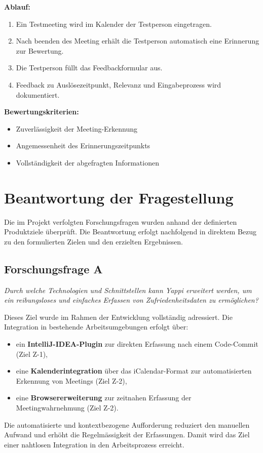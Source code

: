 \documentclass[12pt,a4paper]{report}
\begin{document}
    \textbf{Ablauf:}
    \begin{enumerate}
        \item Ein Testmeeting wird im Kalender der Testperson eingetragen.
        \item Nach beenden des Meeting erhält die Testperson automatisch eine Erinnerung zur Bewertung.
        \item Die Testperson füllt das Feedbackformular aus.
        \item Feedback zu Auslösezeitpunkt, Relevanz und Eingabeprozess wird dokumentiert.
    \end{enumerate}

    \textbf{Bewertungskriterien:}
    \begin{itemize}
        \item Zuverlässigkeit der Meeting-Erkennung
        \item Angemessenheit des Erinnerungszeitpunkts
        \item Vollständigkeit der abgefragten Informationen
    \end{itemize}



\section{Beantwortung der Fragestellung}

    Die im Projekt verfolgten Forschungsfragen wurden anhand der definierten Produktziele überprüft. Die Beantwortung
    erfolgt nachfolgend in direktem Bezug zu den formulierten Zielen und den erzielten Ergebnissen.

    \subsection*{Forschungsfrage A}
    \textit{Durch welche Technologien und Schnittstellen kann Yappi erweitert werden, um ein reibungsloses und einfaches
    Erfassen von Zufriedenheitsdaten zu ermöglichen?}

    Dieses Ziel wurde im Rahmen der Entwicklung vollständig adressiert. Die Integration in bestehende Arbeitsumgebungen
    erfolgt über:
    \begin{itemize}
        \item ein \textbf{IntelliJ-IDEA-Plugin} zur direkten Erfassung nach einem Code-Commit (Ziel Z-1),
        \item eine \textbf{Kalenderintegration} über das iCalendar-Format zur automatisierten Erkennung von Meetings (Ziel Z-2),
        \item eine \textbf{Browsererweiterung} zur zeitnahen Erfassung der Meetingwahrnehmung (Ziel Z-2).
    \end{itemize}
    Die automatisierte und kontextbezogene Aufforderung reduziert den manuellen Aufwand und erhöht die Regelmässigkeit
    der Erfassungen. Damit wird das Ziel einer nahtlosen Integration in den Arbeitsprozess erreicht.
\end{document}
